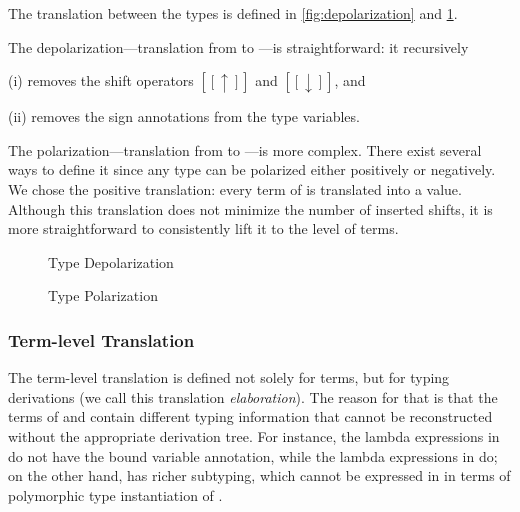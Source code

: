 The translation between the types is defined in 
\cref{fig:depolarization} and \cref{fig:polarization}.

The depolarization---translation from \fexists to \systemf---is
straightforward: it recursively
\begin{enumerate*}
  \item [(i)] removes the shift operators $[[↑]]$ and $[[↓]]$, and
  \item [(ii)] removes the sign annotations from the type variables.
\end{enumerate*}

The polarization---translation from \systemf to \fexists---is more complex.
There exist several ways to define it since any \systemf type can
be polarized either positively or negatively.
We chose the positive translation: every term of \systemf is translated
into a value. Although this translation does not minimize the number of
inserted shifts, it is more straightforward to consistently
lift it to the level of terms.

\begin{figure}[t]
  \begin{minipage}[b]{0.65\linewidth}
    \centering
      \begin{minipage}[t]{0.4\linewidth}
      \ottfundefnunpolP{}
      \end{minipage}
      \begin{minipage}[t]{0.4\linewidth}
      \ottfundefnunpolN{}
      \end{minipage}
    \caption{Type Depolarization}
    \label{fig:depolarization}
  \end{minipage}
  \begin{minipage}[b]{0.3\linewidth}
    \centering
    \ottfundefnpolarP{}
    \caption{Type Polarization}
    \label{fig:polarization}
  \end{minipage}
\end{figure}




\subsubsection{Term-level Translation}

\label{sec:term-level-translation}

The term-level translation is defined not solely for terms, but for typing
derivations (we call this translation \emph{elaboration}). 
The reason for that is that the terms of \systemf and \fexists
contain different typing information that cannot be reconstructed without the
appropriate derivation tree. For instance, the lambda expressions in \systemf do
not have the bound variable annotation, while the lambda expressions in \fexists
do; on the other hand, \fexists has richer subtyping, which cannot be expressed in
in terms of polymorphic type instantiation of \systemf.

